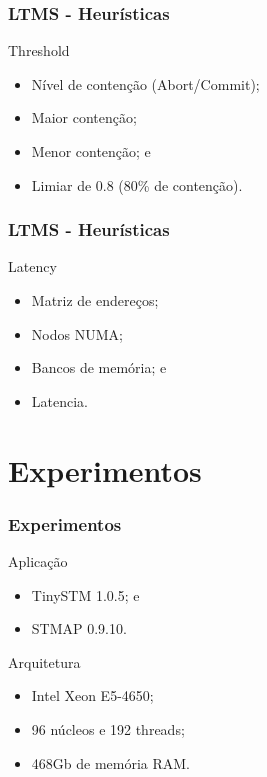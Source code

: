 \documentclass[10pt, pdf,xcolor=pdftex,dvipsnames,table]{beamer}
\begin{document}
\begin{frame} \frametitle{LTMS - Heurísticas}
    \begin{block}{Threshold}
        \begin{itemize}
        	\item Nível de contenção (Abort/Commit);
        	\item Maior contenção;
        	\item Menor contenção; e
        	\item Limiar de 0.8 (80\% de contenção).
        \end{itemize}
    \end{block}
\end{frame}

\begin{frame} \frametitle{LTMS - Heurísticas}
    \begin{block}{Latency}
        \begin{itemize}
        	\item Matriz de endereços;
        	\item Nodos NUMA;
        	\item Bancos de memória; e
        	\item Latencia.
        \end{itemize}
    \end{block}
\end{frame}

\section{Experimentos}
\begin{frame} \frametitle{Experimentos}
    \begin{block}{Aplicação}
        \begin{itemize}
            \item TinySTM 1.0.5; e
            \item STMAP 0.9.10.
        \end{itemize}
    \end{block}
 
    \begin{block}{Arquitetura}
        \begin{itemize}
        	\item Intel Xeon E5-4650;
            \item 96 núcleos e 192 threads;
            \item 468Gb de memória RAM.
        \end{itemize}
    \end{block}
\end{frame}
\end{document}
